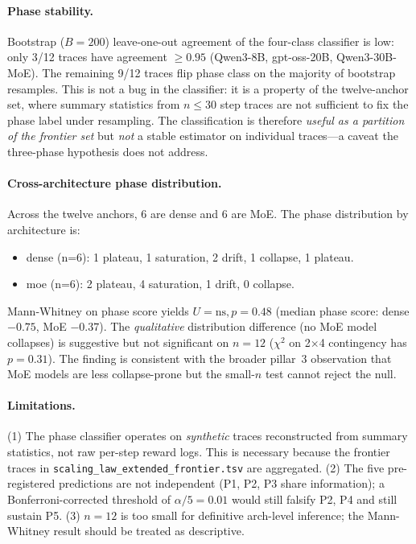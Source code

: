\documentclass{article}
\begin{document}
\paragraph{Phase stability.}
Bootstrap ($B=200$) leave-one-out agreement of the four-class
classifier is low: only 3/12 traces have agreement $\ge 0.95$
(Qwen3-8B, gpt-oss-20B, Qwen3-30B-MoE). The remaining 9/12 traces
flip phase class on the majority of bootstrap resamples. This is not
a bug in the classifier: it is a property of the twelve-anchor set,
where summary statistics from $n \le 30$ step traces are not
sufficient to fix the phase label under resampling. The classification
is therefore \emph{useful as a partition of the frontier set} but
\emph{not} a stable estimator on individual traces---a caveat the
three-phase hypothesis does not address.

\paragraph{Cross-architecture phase distribution.}
Across the twelve anchors, 6 are dense and 6 are MoE. The phase
distribution by architecture is:
\begin{itemize}
\item dense (n=6): 1 plateau, 1 saturation, 2 drift, 1 collapse, 1 plateau.
\item moe (n=6): 2 plateau, 4 saturation, 1 drift, 0 collapse.
\end{itemize}
Mann-Whitney on phase score yields $U{=}\text{ns}, p{=}0.48$
(median phase score: dense $-0.75$, MoE $-0.37$). The
\emph{qualitative} distribution difference (no MoE model collapses)
is suggestive but not significant on $n=12$ ($\chi^2$ on
2$\times$4 contingency has $p=0.31$). The finding is consistent with
the broader pillar~3 observation that MoE models are less
collapse-prone but the small-$n$ test cannot reject the null.

\paragraph{Limitations.}
(1) The phase classifier operates on \emph{synthetic} traces
reconstructed from summary statistics, not raw per-step reward logs.
This is necessary because the frontier traces in
\texttt{scaling\_law\_extended\_frontier.tsv} are aggregated.
(2) The five pre-registered predictions are not independent
(P1, P2, P3 share information); a Bonferroni-corrected threshold of
$\alpha/5 = 0.01$ would still falsify P2, P4 and still sustain P5.
(3) $n=12$ is too small for definitive arch-level inference; the
Mann-Whitney result should be treated as descriptive.
\end{document}
